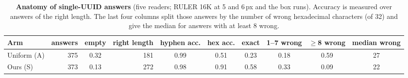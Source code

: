 \begin{table}[!htbp]
\centering
\caption{\textbf{Anatomy of single-UUID answers} (five readers; RULER 16K at 5 and 6\,px and the box runs). Accuracy is measured over answers of the right length. The last four columns split those answers by the number of wrong hexadecimal characters (of 32) and give the median for answers with at least 8 wrong.}
\label{tab:app_anatomy}
\footnotesize
\setlength{\tabcolsep}{3pt}
\begin{tabular}{l r c r c c c c c c}
\toprule
Arm & answers & empty & right length & hyphen acc. & hex acc. & exact & 1--7 wrong & $\ge$8 wrong & median wrong \\
\midrule
Uniform (A) & 375 & 0.32 & 181 & 0.99 & 0.51 & 0.23 & 0.18 & 0.59 & 27 \\
Ours (S) & 373 & 0.13 & 272 & 0.98 & 0.91 & 0.58 & 0.33 & 0.09 & 22 \\
\bottomrule
\end{tabular}
\end{table}
